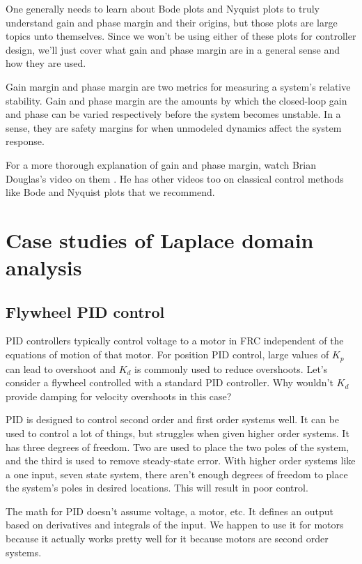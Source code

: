 One generally needs to learn about Bode plots and Nyquist plots to truly
understand gain and phase margin and their origins, but those plots are large
topics unto themselves. Since we won't be using either of these plots for
controller design, we'll just cover what gain and phase margin are in a general
sense and how they are used.

Gain margin and phase margin are two metrics for measuring a system's relative
stability. Gain and phase margin are the amounts by which the closed-loop gain
and phase can be varied respectively before the system becomes unstable. In a
sense, they are safety margins for when unmodeled dynamics affect the system
response.

For a more thorough explanation of gain and phase margin, watch Brian Douglas's
video on them \cite{bib:gain_phase_margin}. He has other videos too on classical
control methods like Bode and Nyquist plots that we recommend.

\section{Case studies of Laplace domain analysis}

\subsection{Flywheel PID control}

PID controllers typically control voltage to a motor in FRC independent of the
equations of motion of that motor. For position PID control, large values of
$K_p$ can lead to overshoot and $K_d$ is commonly used to reduce overshoots.
Let's consider a flywheel controlled with a standard PID controller. Why
wouldn't $K_d$ provide damping for velocity overshoots in this case?

PID is designed to control second order and first order systems well. It can be
used to control a lot of things, but struggles when given higher order systems.
It has three degrees of freedom. Two are used to place the two poles of the
system, and the third is used to remove steady-state error. With higher order
systems like a one input, seven state system, there aren't enough degrees of
freedom to place the system's poles in desired locations. This will result in
poor control.

The math for PID doesn't assume voltage, a motor, etc. It defines an output
based on derivatives and integrals of the input. We happen to use it for motors
because it actually works pretty well for it because motors are second order
systems.

